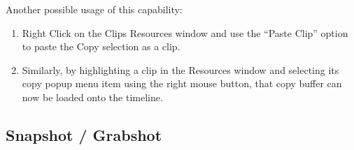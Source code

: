 Another possible usage of this capability:

\begin{enumerate}
    \item  Right Click on the Clips Resources window and use the “Paste Clip” option to paste the Copy selection as a clip.  
    \item  Similarly, by highlighting a clip in the Resources window and selecting its copy popup menu item using the right mouse button, that copy buffer can now be loaded onto the timeline.
\end{enumerate}


\subsection{Snapshot / Grabshot}%
\label{sub:snapshot_grabshot}

